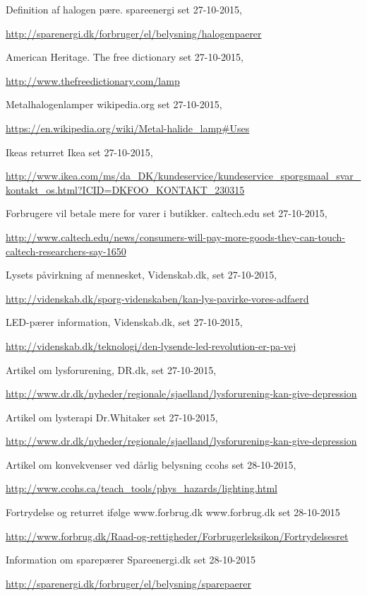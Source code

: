   Definition af halogen pære.
  spareenergi
  set 27-10-2015,
  
  \url{http://sparenergi.dk/forbruger/el/belysning/halogenpaerer}

  American Heritage.
  The free dictionary
  set 27-10-2015,
  
  \url{http://www.thefreedictionary.com/lamp}

  Metalhalogenlamper
  wikipedia.org
  set 27-10-2015,
  
  \url{https://en.wikipedia.org/wiki/Metal-halide_lamp#Uses}

  Ikeas returret
  Ikea
  set 27-10-2015,
  
  \url{http://www.ikea.com/ms/da_DK/kundeservice/kundeservice_sporgsmaal_svar_kontakt_os.html?ICID=DKFOO_KONTAKT_230315}


  Forbrugere vil betale mere for varer i butikker.
  caltech.edu
  set 27-10-2015,
  
  \url{http://www.caltech.edu/news/consumers-will-pay-more-goods-they-can-touch-caltech-researchers-say-1650}

  Lysets påvirkning af mennesket,
  Videnskab.dk,
  set 27-10-2015,
  
  \url{http://videnskab.dk/sporg-videnskaben/kan-lys-pavirke-vores-adfaerd}

  LED-pærer information,
  Videnskab.dk,
  set 27-10-2015,
  
  \url{http://videnskab.dk/teknologi/den-lysende-led-revolution-er-pa-vej}

  Artikel om lysforurening,
  DR.dk,
  set 27-10-2015,
  
  \url{http://www.dr.dk/nyheder/regionale/sjaelland/lysforurening-kan-give-depression}

  Artikel om lysterapi
  Dr.Whitaker
  set 27-10-2015,
  
  \url{http://www.dr.dk/nyheder/regionale/sjaelland/lysforurening-kan-give-depression}

  Artikel om konvekvenser ved dårlig belysning
  ccohs
  set 28-10-2015,
  
  \url{http://www.ccohs.ca/teach_tools/phys_hazards/lighting.html}
  
  Fortrydelse og returret ifølge www.forbrug.dk
  www.forbrug.dk
  set 28-10-2015
  
  \url{http://www.forbrug.dk/Raad-og-rettigheder/Forbrugerleksikon/Fortrydelsesret}
  
  Information om sparepærer
  Spareenergi.dk
  set 28-10-2015
  
  \url{http://sparenergi.dk/forbruger/el/belysning/sparepaerer}



  
